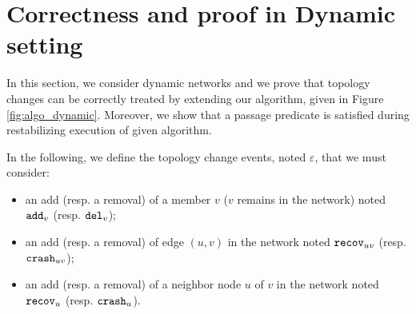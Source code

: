 \documentclass[11pt]{article}
\begin{document}
\section{Correctness and proof in Dynamic setting}



In this section, we consider dynamic networks and we prove that topology changes can be correctly treated by extending our algorithm, given in Figure \ref{fig:algo_dynamic}. Moreover, we show that a passage predicate is satisfied during restabilizing execution of given algorithm.

In the following, we define the topology change events, noted $\varepsilon$, that we must consider:
\begin{itemize}
\item an add (resp. a removal) of a member $v$ ($v$ remains in the network) noted ${\tt add}_v$ (resp. ${\tt del}_v$);
\item an add (resp. a removal) of edge $(u,v)$ in the network noted ${\tt recov}_{uv}$ (resp. ${\tt crash}_{uv}$);
\item an add (resp. a removal) of a neighbor node $u$ of $v$ in the network noted ${\tt recov}_u$ (resp. ${\tt crash}_u$).
\end{itemize}
\end{document}
